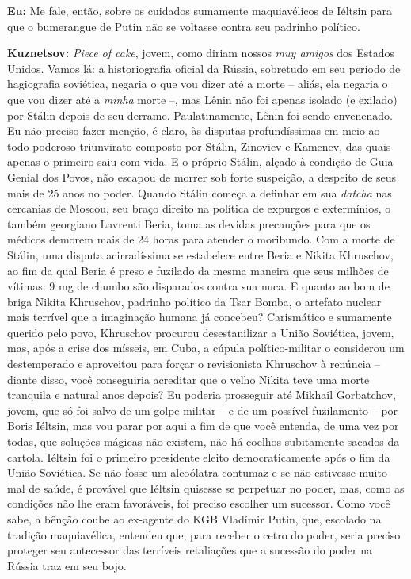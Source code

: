 \textbf{Eu:} Me fale, então, sobre os cuidados sumamente maquiavélicos
de Iéltsin para que o bumerangue de Putin não se voltasse contra seu
padrinho político.

\textbf{Kuznetsov:} \emph{Piece of cake}, jovem, como diriam nossos
\emph{muy amigos} dos Estados Unidos. Vamos lá: a historiografia oficial
da Rússia, sobretudo em seu período de hagiografia soviética, negaria o
que vou dizer até a morte -- aliás, ela negaria o que vou dizer até a
\emph{minha} morte --, mas Lênin não foi apenas isolado (e exilado) por
Stálin depois de seu derrame. Paulatinamente, Lênin foi sendo
envenenado. Eu não preciso fazer menção, é claro, às disputas
profundíssimas em meio ao todo-poderoso triunvirato composto por Stálin,
Zinoviev e Kamenev, das quais apenas o primeiro saiu com vida. E o
próprio Stálin, alçado à condição de Guia Genial dos Povos, não escapou
de morrer sob forte suspeição, a despeito de seus mais de 25 anos no
poder. Quando Stálin começa a definhar em sua \emph{datcha} nas
cercanias de Moscou, seu braço direito na política de expurgos e
extermínios, o também georgiano Lavrenti Beria, toma as devidas
precauções para que os médicos demorem mais de 24 horas para atender o
moribundo. Com a morte de Stálin, uma disputa acirradíssima se
estabelece entre Beria e Nikita Khruschov, ao fim da qual Beria é preso
e fuzilado da mesma maneira que seus milhões de vítimas: 9 mg de chumbo
são disparados contra sua nuca. E quanto ao bom de briga Nikita
Khruschov, padrinho político da Tsar Bomba, o artefato nuclear mais
terrível que a imaginação humana já concebeu? Carismático e sumamente
querido pelo povo, Khruschov procurou desestanilizar a União Soviética,
jovem, mas, após a crise dos mísseis, em Cuba, a cúpula político-militar
o considerou um destemperado e aproveitou para forçar o revisionista
Khruschov à renúncia -- diante disso, você conseguiria acreditar que o
velho Nikita teve uma morte tranquila e natural anos depois? Eu poderia
prosseguir até Mikhail Gorbatchov, jovem, que só foi salvo de um golpe
militar -- e de um possível fuzilamento -- por Boris Iéltsin, mas vou
parar por aqui a fim de que você entenda, de uma vez por todas, que
soluções mágicas não existem, não há coelhos subitamente sacados da
cartola. Iéltsin foi o primeiro presidente eleito democraticamente após
o fim da União Soviética. Se não fosse um alcoólatra contumaz e se não
estivesse muito mal de saúde, é provável que Iéltsin quisesse se
perpetuar no poder, mas, como as condições não lhe eram favoráveis, foi
preciso escolher um sucessor. Como você sabe, a bênção coube ao
ex-agente do KGB Vladímir Putin, que, escolado na tradição maquiavélica,
entendeu que, para receber o cetro do poder, seria preciso proteger seu
antecessor das terríveis retaliações que a sucessão do poder na Rússia
traz em seu bojo.

